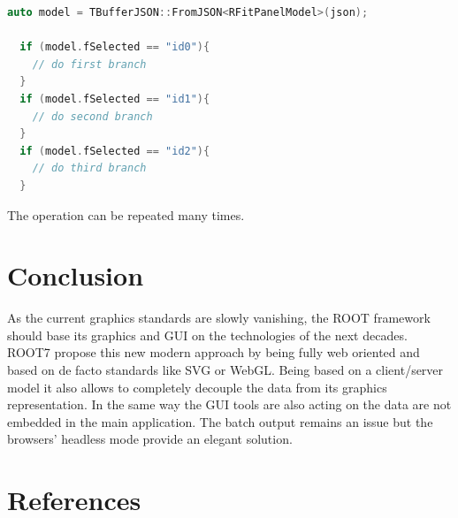 \documentclass[a4paper]{jpconf}
\begin{document}
\begin{lstlisting}[language=C++]
  auto model = TBufferJSON::FromJSON<RFitPanelModel>(json);

  if (model.fSelected == "id0"){
    // do first branch
  }
  if (model.fSelected == "id1"){
    // do second branch
  }
  if (model.fSelected == "id2"){
    // do third branch
  }
\end{lstlisting}
\noindent
The operation can be repeated many times.


\section{Conclusion}

As the current graphics standards are slowly vanishing, the ROOT framework should
base its graphics and GUI on the technologies of the next decades. ROOT7 propose
this new modern approach by being fully web oriented and based on de facto standards
like SVG or WebGL. Being based on a client/server model it also allows to completely
decouple the data from its graphics representation. In the same way the GUI tools
are also acting on the data are not embedded in the main application.
The batch output remains an issue but the browsers' headless mode provide an elegant solution.


\section{References}

\end{document}
